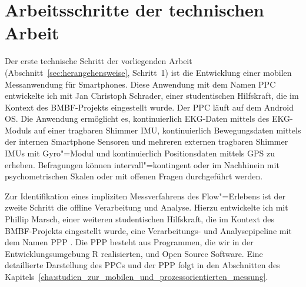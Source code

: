 

\section{Arbeitsschritte der technischen Arbeit} 

\label{sec:arbeitsschritte_der_technischen_arbeit}

Der erste technische Schritt der vorliegenden Arbeit (Abschnitt~\ref{sec:herangehensweise}, Schritt~1) ist die Entwicklung einer mobilen Messanwendung für Smartphones. Diese Anwendung mit dem Namen \ac{PPC} \citep{Bogutzky2016} entwickelte ich mit Jan Christoph Schrader, einer studentischen Hilfskraft, die im Kontext des \acs{BMBF}-Projekts eingestellt wurde. Der \ac{PPC} läuft auf dem Android OS. Die Anwendung ermöglicht es, kontinuierlich \ac{EKG}-Daten mittels des \ac{EKG}-Moduls auf einer tragbaren Shimmer \ac{IMU}, kontinuierlich Bewegungsdaten mittels der internen Smartphone Sensoren und mehreren externen tragbaren Shimmer \ac{IMU}s mit Gyro"=Modul und kontinuierlich Positionsdaten mittels \acs{GPS} zu erheben. Befragungen können intervall"=kontingent oder im Nachhinein mit psychometrischen Skalen oder mit offenen Fragen durchgeführt werden.

Zur Identifikation eines impliziten Messverfahrens des Flow"=Erlebens ist der zweite Schritt die offline Verarbeitung und Analyse. Hierzu entwickelte ich mit Phillip Marsch, einer weiteren studentischen Hilfskraft, die im Kontext des \acs{BMBF}-Projekts eingestellt wurde, eine Verarbeitungs- und Analysepipeline mit dem Namen \ac{PPP} \citep{Bogutzky2016a}. Die \ac{PPP} besteht aus Programmen, die wir in der Entwicklungsumgebung R realisierten, und Open Source Software. Eine detaillierte Darstellung des \ac{PPC}s und der \ac{PPP} folgt in den Abschnitten des Kapitels~\ref{cha:studien_zur_mobilen_und_prozessorientierten_messung}.

